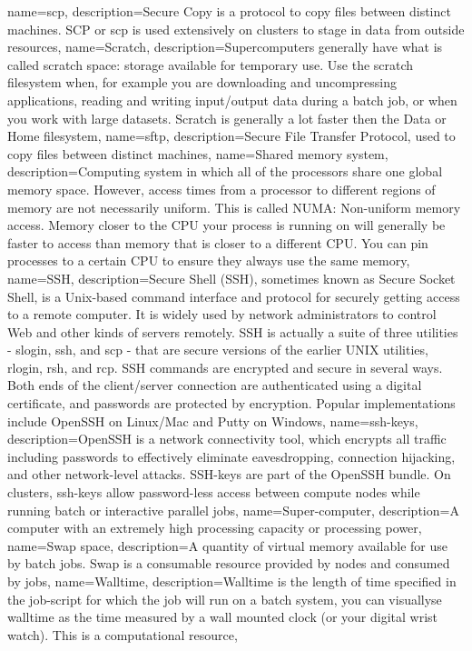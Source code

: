 {
  name={scp},
  description={Secure Copy is a protocol to copy files between distinct machines. SCP or scp is used extensively on \hpc clusters to stage in data from outside resources},
}
{
  name={Scratch},
  description={Supercomputers generally have what is called scratch space: storage available for temporary use. Use the scratch filesystem when, for example you are downloading and uncompressing applications, reading and writing input/output data during a batch job, or when you work with large datasets. Scratch is generally a lot faster then the Data or Home filesystem},
}
{
  name={sftp},
  description={Secure File Transfer Protocol, used to copy files between distinct machines},
}
{
  name={Shared memory system},
  description={Computing system in which all of the processors share one global memory space. However, access times from a processor to different regions of memory are not necessarily uniform. This is called NUMA: Non-uniform memory access. Memory closer to the CPU your process is running on will generally be faster to access than memory that is closer to a different CPU. You can pin processes to a certain CPU to ensure they always use the same memory},
}
{
  name={SSH},
  description={Secure Shell (SSH), sometimes known as Secure Socket Shell, is a Unix-based command interface and protocol for securely getting access to a remote computer. It is widely used by network administrators to control Web and other kinds of servers remotely. SSH is actually a suite of three utilities - slogin, ssh, and scp - that are secure versions of the earlier UNIX utilities, rlogin, rsh, and rcp. SSH commands are encrypted and secure in several ways. Both ends of the client/server connection are authenticated using a digital certificate, and passwords are protected by encryption. Popular implementations include OpenSSH on Linux/Mac and Putty on Windows},
}
{
  name={ssh-keys},
  description={OpenSSH is a network connectivity tool, which encrypts all traffic including passwords to effectively eliminate eavesdropping, connection hijacking, and other network-level attacks. SSH-keys are part of the OpenSSH bundle. On \hpc clusters, ssh-keys allow password-less access between compute nodes while running batch or interactive parallel jobs},
}
{
  name={Super-computer},
  description={A computer with an extremely high processing capacity or processing power},
}
{
  name={Swap space},
  description={A quantity of virtual memory available for use by batch jobs. Swap is a consumable resource provided by nodes and consumed by jobs},
}
{
  name={Walltime},
  description={Walltime is the length of time specified in the job-script for which the job will run on a batch system, you can visuallyse walltime as the time measured by a wall mounted clock (or your digital wrist watch). This is a computational resource},
}
